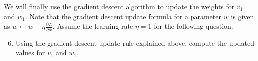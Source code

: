 We will finally use the gradient descent algorithm to update the weights for $v_1$ and $w_1$. Note that the gradient descent update formula for a parameter $w$ is given as $w \leftarrow w - \eta \frac{\partial \mathcal{L}}{\partial w}$. Assume the learning rate $\eta = 1$ for the following question.

\begin{enumerate}
    \setcounter{enumi}{5}
    \item {} Using the gradient descent update rule explained above, compute the updated values for $v_1$ and $w_1$.
    
    
\end{enumerate}